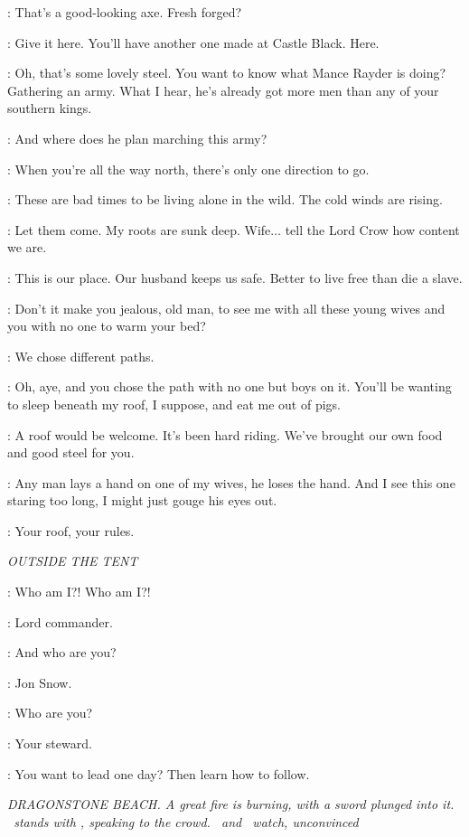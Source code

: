 \CRASTER:  That's a good-looking axe. Fresh forged?

\JEOR: Give it here. You'll have another one made at Castle Black. Here.

\CRASTER: Oh, that's some lovely steel. You want to know what Mance Rayder is doing? Gathering an army. What I hear, he's already got more men than any of your southern kings.

\JEOR: And where does he plan marching this army?

\CRASTER: When you're all the way north, there's only one direction to go.

\JEOR: These are bad times to be living alone in the wild. The cold winds are rising.

\CRASTER: Let them come. My roots are sunk deep. Wife$\ldots$ tell the Lord Crow how content we are.

\GILLY: This is our place. Our husband keeps us safe. Better to live free than die a slave.

\CRASTER: Don't it make you jealous, old man, to see me with all these young wives and you with no one to warm your bed?

\JEOR: We chose different paths.

\CRASTER: Oh, aye, and you chose the path with no one but boys on it. You'll be wanting to sleep beneath my roof, I suppose, and eat me out of pigs.

\JEOR: A roof would be welcome. It's been hard riding. We've brought our own food and good steel for you.

\CRASTER: Any man lays a hand on one of my wives, he loses the hand. And I see this one staring too long, I might just gouge his eyes out.

\JEOR: Your roof, your rules.


\scene

\textit{OUTSIDE THE TENT}

\JEOR: Who am I?! Who am I?!

\JON: Lord commander.

\JEOR: And who are you?

\JON: Jon Snow.

\JEOR: Who are you?

\JON: Your steward.

\JEOR: You want to lead one day? Then learn how to follow.


\scene

\textit{DRAGONSTONE BEACH.  A great fire is burning, with a sword plunged into it.  \MELISANDRE ~stands with \STANNIS, speaking to the crowd.  \DAVOS ~and \CRESSEN ~watch, unconvinced}

